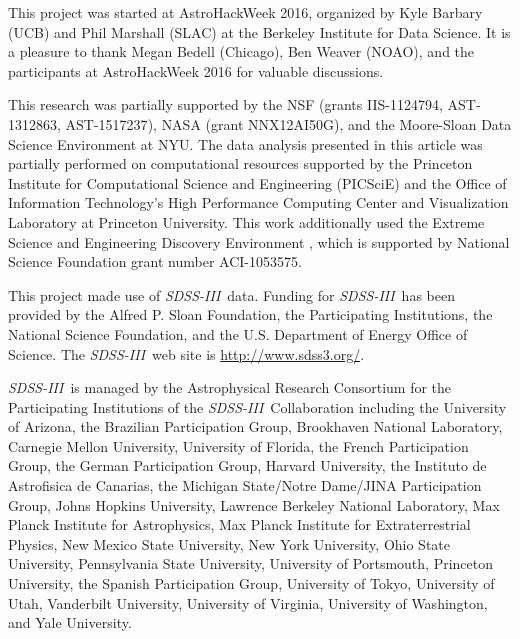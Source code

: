 \documentclass[manuscript, letterpaper]{aastex6}
\newcommand{\project}[1]{\textsl{#1}}
\newcommand{\acronym}[1]{{\small{#1}}}
\newcommand{\sdssiii}{\project{\acronym{SDSS-III}}}
\begin{document}
\acknowledgements
This project was started at AstroHackWeek 2016, organized by Kyle
Barbary (UCB) and Phil Marshall (SLAC) at the Berkeley Institute for
Data Science.
It is a pleasure to thank
  Megan Bedell (Chicago),
  Ben Weaver (NOAO),
  and the participants at AstroHackWeek 2016
for valuable discussions.

This research was partially supported by
  the \acronym{NSF} (grants \acronym{IIS-1124794}, \acronym{AST-1312863}, \acronym{AST-1517237}),
  \acronym{NASA} (grant \acronym{NNX12AI50G}),
  and the Moore-Sloan Data Science Environment at \acronym{NYU}.
The data analysis presented in this article was partially performed on
computational resources supported by the Princeton Institute for Computational
Science and Engineering (PICSciE) and the Office of Information Technology's
High Performance Computing Center and Visualization Laboratory at Princeton
University.
This work additionally used the Extreme Science and Engineering Discovery
Environment \citep[XSEDE;][]{Towns:2014}, which is supported by National
Science Foundation grant number ACI-1053575.

This project made use of \sdssiii\ data. Funding for \sdssiii\ has been
provided by the Alfred P. Sloan Foundation, the Participating Institutions, the
National Science Foundation, and the \acronym{U.S.} Department of Energy Office
of Science. The \sdssiii\ web site is \url{http://www.sdss3.org/}.

\sdssiii\ is managed by the Astrophysical Research Consortium for the
Participating Institutions of the \sdssiii\ Collaboration including the
University of Arizona, the Brazilian Participation Group, Brookhaven National
Laboratory, Carnegie Mellon University, University of Florida, the French
Participation Group, the German Participation Group, Harvard University, the
Instituto de Astrofisica de Canarias, the Michigan State/Notre
Dame/\acronym{JINA} Participation Group, Johns Hopkins University, Lawrence
Berkeley National Laboratory, Max Planck Institute for Astrophysics, Max Planck
Institute for Extraterrestrial Physics, New Mexico State University, New York
University, Ohio State University, Pennsylvania State University, University of
Portsmouth, Princeton University, the Spanish Participation Group, University
of Tokyo, University of Utah, Vanderbilt University, University of Virginia,
University of Washington, and Yale University.




\end{document}
